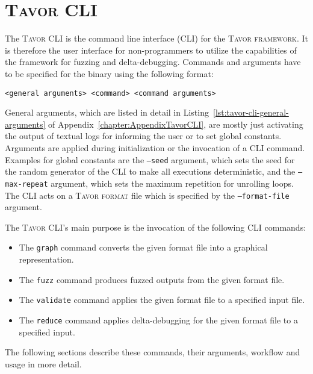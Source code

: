 \chapter{\textsc{Tavor CLI}}
\label{chapter:tavorCLI}

The \textsc{Tavor CLI} is the command line interface (CLI) for the \textsc{Tavor framework}. It is therefore the user interface for non-programmers to utilize the capabilities of the framework for fuzzing and delta-debugging. Commands and arguments have to be specified for the binary using the following format:

\begin{center}
\texttt{<general arguments> <command> <command arguments>}
\end{center}

General arguments, which are listed in detail in Listing~\ref{lst:tavor-cli-general-arguments} of Appendix~\ref{chapter:AppendixTavorCLI}, are mostly just activating the output of textual logs for informing the user or to set global constants. Arguments are applied during initialization or the invocation of a CLI command. Examples for global constants are the \texttt{---seed} argument, which sets the seed for the random generator of the CLI to make all executions deterministic, and the \texttt{---max-repeat} argument, which sets the maximum repetition for unrolling loops. The CLI acts on a \textsc{Tavor format} file which is specified by the \texttt{---format-file} argument.

The \textsc{Tavor CLI}'s main purpose is the invocation of the following CLI commands:

\begin{itemize}
\item The \texttt{graph} command converts the given format file into a graphical representation.
\item The \texttt{fuzz} command produces fuzzed outputs from the given format file.
\item The \texttt{validate} command applies the given format file to a specified input file.
\item The \texttt{reduce} command applies delta-debugging for the given format file to a specified input.
\end{itemize}

The following sections describe these commands, their arguments, workflow and usage in more detail.

\label{sec:tavor-cli-graph}

